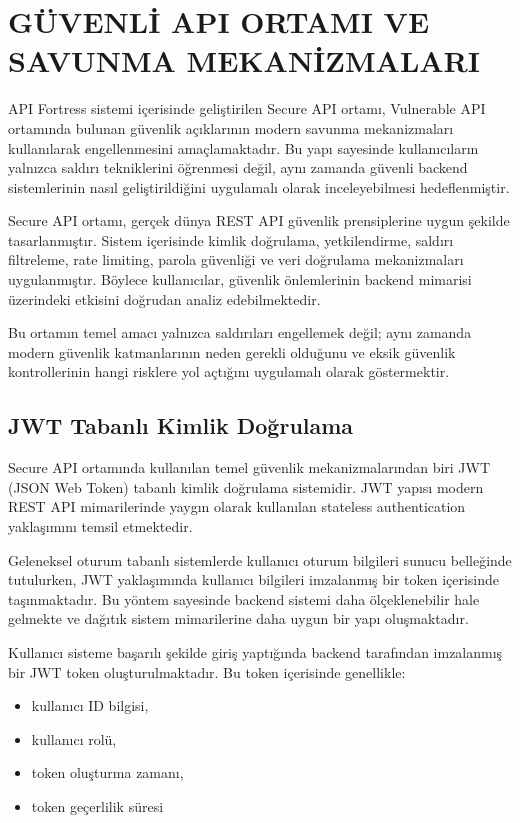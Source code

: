 \section{GÜVENLİ API ORTAMI VE SAVUNMA MEKANİZMALARI}
\label{bolum7}

API Fortress sistemi içerisinde geliştirilen Secure API ortamı, Vulnerable API ortamında bulunan güvenlik açıklarının modern savunma mekanizmaları kullanılarak engellenmesini amaçlamaktadır. Bu yapı sayesinde kullanıcıların yalnızca saldırı tekniklerini öğrenmesi değil, aynı zamanda güvenli backend sistemlerinin nasıl geliştirildiğini uygulamalı olarak inceleyebilmesi hedeflenmiştir.

Secure API ortamı, gerçek dünya REST API güvenlik prensiplerine uygun şekilde tasarlanmıştır. Sistem içerisinde kimlik doğrulama, yetkilendirme, saldırı filtreleme, rate limiting, parola güvenliği ve veri doğrulama mekanizmaları uygulanmıştır. Böylece kullanıcılar, güvenlik önlemlerinin backend mimarisi üzerindeki etkisini doğrudan analiz edebilmektedir.

Bu ortamın temel amacı yalnızca saldırıları engellemek değil; aynı zamanda modern güvenlik katmanlarının neden gerekli olduğunu ve eksik güvenlik kontrollerinin hangi risklere yol açtığını uygulamalı olarak göstermektir.

\subsection{JWT Tabanlı Kimlik Doğrulama}
\label{jwt-tabanl-kimlik-do-rulama}

Secure API ortamında kullanılan temel güvenlik mekanizmalarından biri JWT (JSON Web Token) tabanlı kimlik doğrulama sistemidir. JWT yapısı modern REST API mimarilerinde yaygın olarak kullanılan stateless authentication yaklaşımını temsil etmektedir.

Geleneksel oturum tabanlı sistemlerde kullanıcı oturum bilgileri sunucu belleğinde tutulurken, JWT yaklaşımında kullanıcı bilgileri imzalanmış bir token içerisinde taşınmaktadır. Bu yöntem sayesinde backend sistemi daha ölçeklenebilir hale gelmekte ve dağıtık sistem mimarilerine daha uygun bir yapı oluşmaktadır.

Kullanıcı sisteme başarılı şekilde giriş yaptığında backend tarafından imzalanmış bir JWT token oluşturulmaktadır. Bu token içerisinde genellikle:

\begin{itemize}[leftmargin=*]
    \item kullanıcı ID bilgisi,
    \item kullanıcı rolü,
    \item token oluşturma zamanı,
    \item token geçerlilik süresi
\end{itemize}

